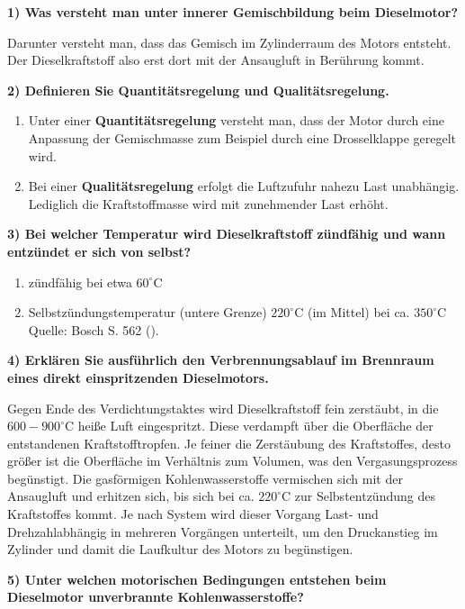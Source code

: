 \textbf{1) Was versteht man unter innerer Gemischbildung beim
Dieselmotor?}

Darunter versteht man, dass das Gemisch im Zylinderraum des Motors
entsteht. Der Dieselkraftstoff also erst dort mit der Ansaugluft in
Berührung kommt.

\textbf{2) Definieren Sie Quantitätsregelung und Qualitätsregelung.}

\begin{enumerate}
\item
  Unter einer \textbf{Quantitätsregelung} versteht man, dass der Motor
  durch eine Anpassung der Gemischmasse zum Beispiel durch eine
  Drosselklappe geregelt wird.
\item
  Bei einer \textbf{Qualitätsregelung} erfolgt die Luftzufuhr nahezu
  Last unabhängig. Lediglich die Kraftstoffmasse wird mit zunehmender
  Last erhöht.
\end{enumerate}

\textbf{3) Bei welcher Temperatur wird Dieselkraftstoff zündfähig und
wann entzündet er sich von selbst?}

\begin{enumerate}
\item
  zündfähig bei etwa $60^\circ\text{C}$
\item
  Selbstzündungstemperatur (untere Grenze) $220^\circ\text{C}$ (im
  Mittel) bei ca. $350^\circ\text{C}$ Quelle: Bosch S. 562
  (\textcite{reif:2022:boschkraftfahrtechnisches}).
\end{enumerate}

\textbf{4) Erklären Sie ausführlich den Verbrennungsablauf im Brennraum
eines direkt einspritzenden Dieselmotors.}

Gegen Ende des Verdichtungstaktes wird Dieselkraftstoff fein zerstäubt,
in die $600 - 900^\circ\text{C}$ heiße Luft eingespritzt. Diese
verdampft über die Oberfläche der entstandenen Kraftstofftropfen. Je
feiner die Zerstäubung des Kraftstoffes, desto größer ist die Oberfläche
im Verhältnis zum Volumen, was den Vergasungsprozess begünstigt. Die
gasförmigen Kohlenwasserstoffe vermischen sich mit der Ansaugluft und
erhitzen sich, bis sich bei ca. $220^\circ\text{C}$ zur
Selbstentzündung des Kraftstoffes kommt. Je nach System wird dieser
Vorgang Last- und Drehzahlabhängig in mehreren Vorgängen unterteilt, um
den Druckanstieg im Zylinder und damit die Laufkultur des Motors zu
begünstigen.

\textbf{5) Unter welchen motorischen Bedingungen entstehen beim
Dieselmotor unverbrannte Kohlenwasserstoffe?}


